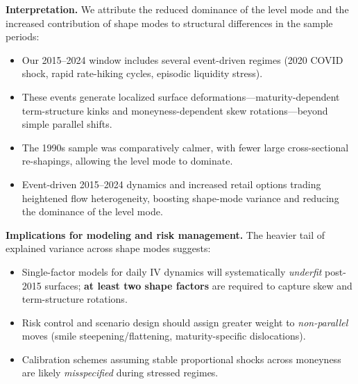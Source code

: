 \documentclass[a4paper,12pt]{report}
\begin{document}
\textbf{Interpretation.}  
We attribute the reduced dominance of the level mode and the increased contribution of shape modes to structural differences in the sample periods:
\begin{itemize}
    \item Our 2015--2024 window includes several event-driven regimes (2020 COVID shock, rapid rate-hiking cycles, episodic liquidity stress).
    \item These events generate localized surface deformations—maturity-dependent term-structure kinks and moneyness-dependent skew rotations—beyond simple parallel shifts.
    \item The 1990s sample was comparatively calmer, with fewer large cross-sectional re-shapings, allowing the level mode to dominate.
    \item  Event-driven 2015–2024 dynamics and increased retail options trading heightened flow heterogeneity, boosting shape-mode variance and reducing the dominance of the level mode.
\end{itemize}

\textbf{Implications for modeling and risk management.}  
The heavier tail of explained variance across shape modes suggests:
\begin{itemize}
    \item Single-factor models for daily IV dynamics will systematically \textit{underfit} post-2015 surfaces; \textbf{at least two shape factors} are required to capture skew and term-structure rotations.
    \item Risk control and scenario design should assign greater weight to \textit{non-parallel} moves (smile steepening/flattening, maturity-specific dislocations).
    \item Calibration schemes assuming stable proportional shocks across moneyness are likely \textit{misspecified} during stressed regimes.
\end{itemize}
\end{document}
